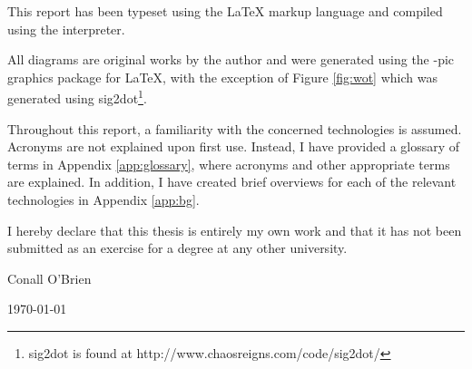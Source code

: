 
This report has been typeset using the \textrm{\LaTeX{}} markup language 
and compiled using the \textrm{\LaTeXe{}} interpreter. 


All diagrams are original works by the author and were generated 
using the \textrm{\Xy-pic{}} graphics package for \textrm{\LaTeX{}},
with the exception of Figure \ref{fig:wot} which was generated using
sig2dot\footnote{sig2dot is found at http://www.chaosreigns.com/code/sig2dot/}.


Throughout this report, a familiarity with the concerned technologies is
assumed. Acronyms are not explained upon first use. Instead, I have 
provided a glossary of terms in Appendix \ref{app:glossary}, where 
acronyms and other appropriate terms are explained. In addition, I have 
created brief overviews for each of the relevant technologies in 
Appendix \ref{app:bg}.



\vfill


I hereby declare that this thesis is entirely my own work and that it
has not been submitted as an exercise for a degree at any other
university.

\vspace{35mm}

\begin{flushright}

\underline{\hspace*{75mm}}

Conall O'Brien

\today

\end{flushright}
